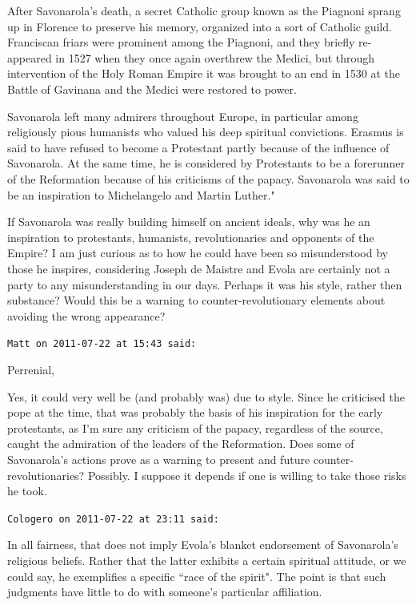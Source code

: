 \begin{footnotesize}
\begin{sffamily}
After Savonarola's death, a secret Catholic group known as the Piagnoni sprang up in Florence to preserve his memory, organized into a sort of Catholic guild. Franciscan friars were prominent among the Piagnoni, and they briefly re-appeared in 1527 when they once again overthrew the Medici, but through intervention of the Holy Roman Empire it was brought to an end in 1530 at the Battle of Gavinana and the Medici were restored to power.

Savonarola left many admirers throughout Europe, in particular among religiously pious humanists who valued his deep spiritual convictions. Erasmus is said to have refused to become a Protestant partly because of the influence of Savonarola. At the same time, he is considered by Protestants to be a forerunner of the Reformation because of his criticisms of the papacy. Savonarola was said to be an inspiration to Michelangelo and Martin Luther." 

If Savonarola was really building himself on ancient ideals, why was he an inspiration to protestants, humanists, revolutionaries and opponents of the Empire? I am just curious as to how he could have been so misunderstood by those he inspires, considering Joseph de Maistre and Evola are certainly not a party to any misunderstanding in our days. Perhaps it was his style, rather then substance? Would this be a warning to counter-revolutionary elements about avoiding the wrong appearance?


\hfill

\texttt{Matt on 2011-07-22 at 15:43 said: }

Perrenial,

Yes, it could very well be (and probably was) due to style. Since he criticised the pope at the time, that was probably the basis of his inspiration for the early protestants, as I'm sure any criticism of the papacy, regardless of the source, caught the admiration of the leaders of the Reformation. Does some of Savonarola's actions prove as a warning to present and future counter-revolutionaries? Possibly. I suppose it depends if one is willing to take those risks he took.


\hfill

\texttt{Cologero on 2011-07-22 at 23:11 said: }

In all fairness, that does not imply Evola's blanket endorsement of Savonarola's religious beliefs. Rather that the latter exhibits a certain spiritual attitude, or we could say, he exemplifies a specific ``race of the spirit". The point is that such judgments have little to do with someone's particular affiliation.



\end{sffamily}
\end{footnotesize}
